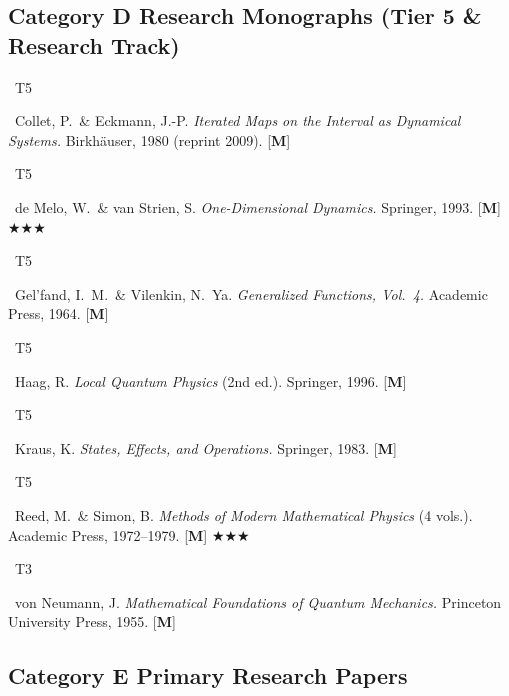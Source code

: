 \documentclass[11pt,a4paper]{article}
\newcommand{\tierbadge}[2]{%
  \colorbox{#1}{\small\bfseries\color{white}\strut\ #2\ }%
}
\newcommand{\essential}{$\bigstar\bigstar\bigstar$}
\begin{document}
\subsection*{Category D \quad Research Monographs (Tier 5 \& Research Track)}

\begin{tcolorbox}[catbox]
\begin{enumerate}[leftmargin=2.5em, label=\textbf{[D\arabic*]}, itemsep=5pt]
  \item \tierbadge{t5red}{T5}\ Collet, P.\ \& Eckmann, J.-P. \textit{Iterated Maps on the Interval as Dynamical Systems.} Birkh\"auser, 1980 (reprint 2009). [\textbf{M}]
  \item \tierbadge{t5red}{T5}\ de Melo, W.\ \& van Strien, S. \textit{One-Dimensional Dynamics.} Springer, 1993. [\textbf{M}] \essential
  \item \tierbadge{t5red}{T5}\ Gel'fand, I.~M.\ \& Vilenkin, N.~Ya. \textit{Generalized Functions, Vol.~4.} Academic Press, 1964. [\textbf{M}]
  \item \tierbadge{t5red}{T5}\ Haag, R. \textit{Local Quantum Physics} (2nd ed.). Springer, 1996. [\textbf{M}]
  \item \tierbadge{t5red}{T5}\ Kraus, K. \textit{States, Effects, and Operations.} Springer, 1983. [\textbf{M}]
  \item \tierbadge{t5red}{T5}\ Reed, M.\ \& Simon, B. \textit{Methods of Modern Mathematical Physics} (4 vols.). Academic Press, 1972--1979. [\textbf{M}] \essential
  \item \tierbadge{t3purple}{T3}\ von Neumann, J. \textit{Mathematical Foundations of Quantum Mechanics.} Princeton University Press, 1955. [\textbf{M}]
\end{enumerate}
\end{tcolorbox}

\subsection*{Category E \quad Primary Research Papers}
\end{document}
